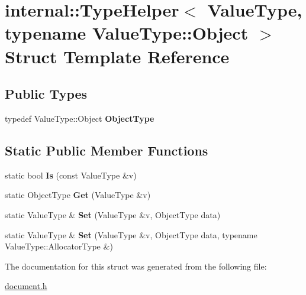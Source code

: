\hypertarget{a02068}{}\section{internal\+:\+:Type\+Helper$<$ Value\+Type, typename Value\+Type\+:\+:Object $>$ Struct Template Reference}
\label{a02068}
\subsection*{Public Types}
\begin{DoxyCompactItemize}
\item 
\mbox{\label{a02068_ac5d59bffe76792786fd5f1ba4da94dd9}} 
typedef Value\+Type\+::\+Object {\bfseries Object\+Type}
\end{DoxyCompactItemize}
\subsection*{Static Public Member Functions}
\begin{DoxyCompactItemize}
\item 
\mbox{\label{a02068_a6c8bcb7479d2c4c96ae6dcaac808e227}} 
static bool {\bfseries Is} (const Value\+Type \&v)
\item 
\mbox{\label{a02068_ae1debd6b9c125d4206e43a74ddbd0795}} 
static Object\+Type {\bfseries Get} (Value\+Type \&v)
\item 
\mbox{\label{a02068_a7655ed9b6c7443d99063ec20769b9984}} 
static Value\+Type \& {\bfseries Set} (Value\+Type \&v, Object\+Type data)
\item 
\mbox{\label{a02068_a41825b964c6188a07539b7ab2e6ed194}} 
static Value\+Type \& {\bfseries Set} (Value\+Type \&v, Object\+Type data, typename Value\+Type\+::\+Allocator\+Type \&)
\end{DoxyCompactItemize}


The documentation for this struct was generated from the following file\+:\begin{DoxyCompactItemize}
\item 
\hyperlink{a00476}{document.\+h}\end{DoxyCompactItemize}
